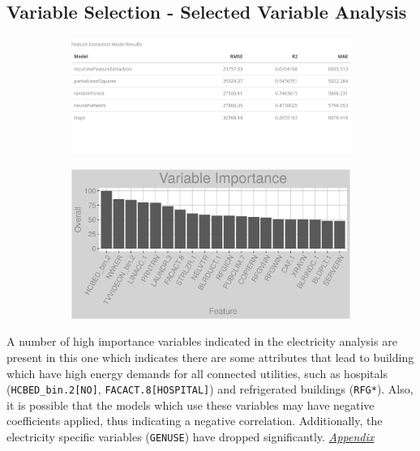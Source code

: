 \subsection{Variable Selection - Selected Variable Analysis}
\begin{figure}[h]
\begin{subfigure}{1\textwidth}
\centering
\includegraphics[width=.6\textwidth, height=0.2\textheight]{Images/natural_gas_fe_summary.png}
\end{subfigure}
\begin{subfigure}{1\textwidth}
\centering
\includegraphics[width=.99\textwidth, height=0.3\textheight]{Images/natural_gas_all_vars.png}
\end{subfigure}
\end{figure}
A number of high importance variables indicated in the electricity analysis are present in this one which indicates there are some attributes that lead to building which have high energy demands for all connected utilities, such as hospitals (\lstinline{HCBED_bin.2[NO]}, \lstinline{FACACT.8[HOSPITAL]}) and refrigerated buildings (\lstinline{RFG*}). Also, it is possible that the models which use these variables may have negative coefficients applied, thus indicating a negative correlation. Additionally, the electricity specific variables (\lstinline{GENUSE}) have dropped significantly. \textit{\hyperref[appendix:electricity:sva]{Appendix}}